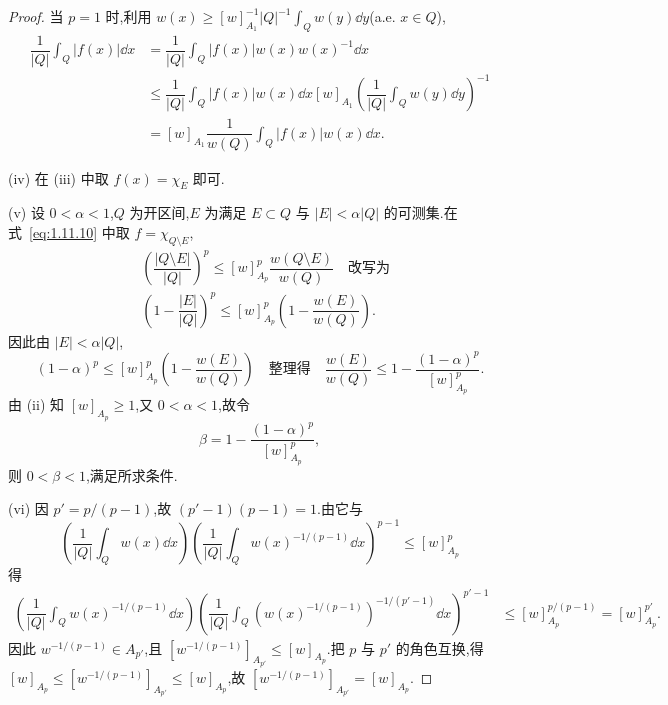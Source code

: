 \begin{proof}
当 $p = 1$ 时,利用 $w(x) \geq [w]_{A_{1}}^{-1}|Q|^{-1}\int_{Q}w(y)\dd y$(a.e. $x \in Q$),
\begin{align*}
\dfrac{1}{|Q|}\displaystyle\int_{Q}|f(x)|\dd x & = \dfrac{1}{|Q|}\int_{Q}|f(x)|w(x)w(x)^{-1}\dd x \\
& \leq \dfrac{1}{|Q|}\displaystyle\int_{Q}|f(x)|w(x)\dd x[w]_{A_{1}}\left(\dfrac{1}{|Q|}\int_{Q}w(y)\dd y\right)^{-1} \\
& = [w]_{A_{1}}\dfrac{1}{w(Q)}\displaystyle\int_{Q}|f(x)|w(x)\dd x.
\end{align*}

(iv) 在 (iii) 中取 $f(x) = \chi_{E}$ 即可.

(v) 设 $0 < \alpha < 1$,$Q$ 为开区间,$E$ 为满足 $E \subset Q$ 与 $|E| < \alpha|Q|$ 的可测集.在式~\eqref{eq:1.11.10} 中取 $f = \chi_{Q\setminus E}$,
\begin{align*}
& \left(\dfrac{|Q \setminus E|}{|Q|}\right)^{p} \leq [w]_{A_{p}}^{p}\dfrac{w(Q \setminus E)}{w(Q)} \quad \text{改写为} \\
& \left(1 - \dfrac{|E|}{|Q|}\right)^{p} \leq [w]_{A_{p}}^{p}\left(1 - \dfrac{w(E)}{w(Q)}\right).
\end{align*}
因此由 $|E| < \alpha|Q|$,
\begin{equation*}
(1 - \alpha)^{p} \leq [w]_{A_{p}}^{p}\left(1 - \frac{w(E)}{w(Q)}\right) \quad \text{整理得} \quad \frac{w(E)}{w(Q)} \leq 1 - \frac{(1 - \alpha)^{p}}{[w]_{A_{p}}^{p}}.
\end{equation*}
由 (ii) 知 $[w]_{A_{p}} \geq 1$,又 $0 < \alpha < 1$,故令
\begin{equation*}
\beta = 1 - \frac{(1 - \alpha)^{p}}{[w]_{A_{p}}^{p}},
\end{equation*}
则 $0 < \beta < 1$,满足所求条件.

(vi) 因 $p' = p/(p - 1)$,故 $(p' - 1)(p - 1) = 1$.由它与
\begin{equation}\tag{1.11.11}
\left(\frac{1}{|Q|}\int_{Q}w(x)\dd x\right)\left(\frac{1}{|Q|}\int_{Q}w(x)^{-1/(p-1)}\dd x\right)^{p-1} \leq [w]_{A_{p}}^{p}
\label{eq:1.11.11}\end{equation}
得
\begin{align*}
\left(\dfrac{1}{|Q|}\displaystyle\int_{Q}w(x)^{-1/(p-1)}\dd x\right)\left(\dfrac{1}{|Q|}\int_{Q}\left(w(x)^{-1/(p-1)}\right)^{-1/(p'-1)}\dd x\right)^{p'-1}&\leq [w]_{A_{p}}^{p/(p-1)} = [w]_{A_{p}}^{p'}.
 \end{align*}
因此 $w^{-1/(p-1)} \in A_{p'}$,且 $[w^{-1/(p-1)}]_{A_{p'}} \leq [w]_{A_{p}}$.把 $p$ 与 $p'$ 的角色互换,得 $[w]_{A_{p}} \leq [w^{-1/(p-1)}]_{A_{p'}} \leq [w]_{A_{p}}$,故 $[w^{-1/(p-1)}]_{A_{p'}} = [w]_{A_{p}}$.
\end{proof}

